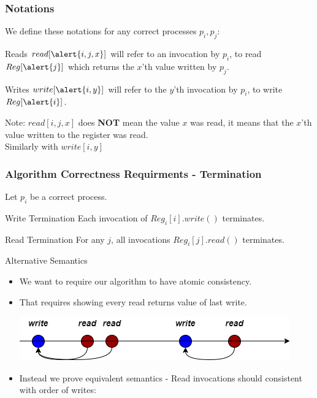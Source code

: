 \begin{frame}
    \frametitle{Notations}
    We define these notations for any correct processes $p_i, p_j$:
    \begin{block}{Reads}
        $read[\alert{i,j,x}]$ will refer to an invocation by $p_i$, to read $Reg[\alert{j}]$
        which returns the \alert{$x$}'th value written by \alert{$p_j$}.
    \end{block}
    \begin{block}{Writes}
        $write[\alert{i,y}]$ will refer to the \alert{$y$}'th invocation by \alert{$p_i$}, to write $Reg[\alert{i}]$.
    \end{block}
    \pause
    Note: $read[i,j,x]$ does \textbf{NOT} mean the value $x$ was read,
    it means that the $x$'th value written to the register was read.\\
    Similarly with $write[i,y]$

\end{frame}
\begin{frame}
    \frametitle{Algorithm Correctness Requirments - Termination}
    Let $p_i$ be a correct process.
    \begin{block}{Write Termination}
        Each invocation of $Reg_i[i].write()$ terminates.
    \end{block}
    \begin{block}{Read Termination}
        For any $j$, all invocations $Reg_i[j].read()$ terminates.
    \end{block}
\end{frame}
\begin{frame}{Alternative Semantics}
    \begin{itemize}
        \item We want to require our algorithm to have atomic consistency.
        \pause
        \item That requires showing every read returns value of last write.
        \begin{center}
            \includegraphics[scale=.4]{resources/vanilla_semantics.png}
        \end{center}
        \pause
        \item Instead we prove equivalent semantics - Read invocations should consistent with order of writes:
    \end{itemize}
    
\end{frame}

